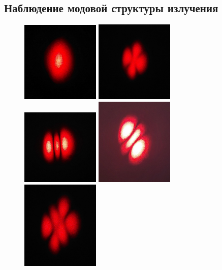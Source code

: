 \subsection*{Наблюдение модовой структуры излучения}

\begin{figure}[H]
	\includegraphics[width=0.33333\textwidth, height = 0.33333\textwidth]{../Изображения/00.jpg}
	\includegraphics[width=0.33333\textwidth, height = 0.33333\textwidth]{../Изображения/11.jpg}
	\includegraphics[width=0.33333\textwidth, height = 0.33333\textwidth]{../Изображения/20.jpg}
	\includegraphics[width=0.33333\textwidth, height = 0.33333\textwidth]{../Изображения/20_2.jpg}
	\includegraphics[width=0.33333\textwidth, height = 0.33333\textwidth]{../Изображения/21.jpg}

\end{figure}
